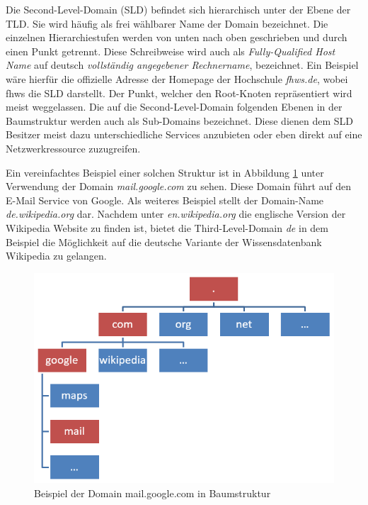 Die Second-Level-Domain (SLD) befindet sich hierarchisch unter der Ebene der TLD. Sie wird häufig als frei wählbarer Name der Domain bezeichnet. Die einzelnen Hierarchiestufen werden von unten nach oben geschrieben und durch einen Punkt getrennt. Diese Schreibweise wird auch als \textit{Fully-Qualified Host Name} auf deutsch \textit{vollständig angegebener Rechnername}, bezeichnet. Ein Beispiel wäre hierfür die offizielle Adresse der Homepage der Hochschule \textit{fhws.de}, wobei fhws die SLD darstellt. Der Punkt, welcher den Root-Knoten repräsentiert wird meist weggelassen. Die auf die Second-Level-Domain folgenden Ebenen in der Baumstruktur werden auch als Sub-Domains bezeichnet. Diese dienen dem SLD Besitzer meist dazu unterschiedliche Services anzubieten oder eben direkt auf eine Netzwerkressource zuzugreifen. \cite{Schreiner.2016} \cite{1und1.2018} 

Ein vereinfachtes Beispiel einer solchen Struktur ist in Abbildung \ref{fig:DNSTree} unter Verwendung der Domain \textit{mail.google.com} zu sehen. Diese Domain führt auf den E-Mail Service von Google. Als weiteres Beispiel stellt der Domain-Name \textit{de.wikipedia.org} dar. Nachdem unter \textit{en.wikipedia.org} die englische Version der Wikipedia Website zu finden ist, bietet die Third-Level-Domain \textit{de} in dem Beispiel die Möglichkeit auf die deutsche Variante der Wissensdatenbank Wikipedia zu gelangen.

\begin{figure}[ht]
\includegraphics[width=\columnwidth]{images/dnsTree.png}
\caption{Beispiel der Domain mail.google.com in Baumstruktur}
\label{fig:DNSTree}
\end{figure}

